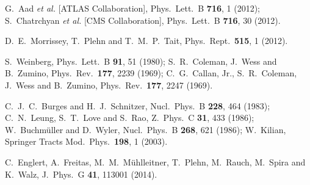   G.~Aad {\it et al.} [ATLAS Collaboration],
  Phys.\ Lett.\ B {\bf 716}, 1 (2012);
  S.~Chatrchyan {\it et al.}  [CMS Collaboration],
  Phys.\ Lett.\ B {\bf 716}, 30 (2012).

  D.~E.~Morrissey, T.~Plehn and T.~M.~P.~Tait,
  Phys.\ Rept.\  {\bf 515}, 1 (2012).

  S.~Weinberg,
  Phys.\ Lett.\ B {\bf 91}, 51 (1980);
  S.~R.~Coleman, J.~Wess and B.~Zumino,
  Phys.\ Rev.\  {\bf 177}, 2239 (1969);
  C.~G.~Callan, Jr., S.~R.~Coleman, J.~Wess and B.~Zumino,
  Phys.\ Rev.\  {\bf 177}, 2247 (1969).

  C.~J.~C.~Burges and H.~J.~Schnitzer,
  Nucl.\ Phys.\ B {\bf 228}, 464 (1983); 
  C.~N.~Leung, S.~T.~Love and S.~Rao,
  Z.\ Phys.\ C {\bf 31}, 433 (1986); 
  W.~Buchm\"uller and D.~Wyler,
  Nucl.\ Phys.\ B {\bf 268}, 621 (1986);
  W.~Kilian,
  Springer Tracts Mod.\ Phys.\  {\bf 198}, 1 (2003).
  
  C.~Englert, A.~Freitas, M.~M.~M\"uhlleitner, T.~Plehn, M.~Rauch, M.~Spira and K.~Walz,
  J.\ Phys.\ G {\bf 41}, 113001 (2014).

